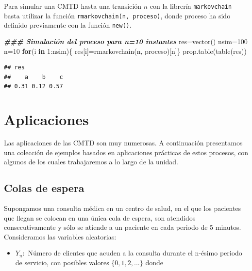 \documentclass[
]{book}
\newenvironment{Shaded}{\begin{snugshade}}{\end{snugshade}}
\newcommand{\ControlFlowTok}[1]{\textcolor[rgb]{0.13,0.29,0.53}{\textbf{#1}}}
\newcommand{\DecValTok}[1]{\textcolor[rgb]{0.00,0.00,0.81}{#1}}
\newcommand{\DocumentationTok}[1]{\textcolor[rgb]{0.56,0.35,0.01}{\textbf{\textit{#1}}}}
\newcommand{\FunctionTok}[1]{\textcolor[rgb]{0.00,0.00,0.00}{#1}}
\newcommand{\NormalTok}[1]{#1}
\newcommand{\OtherTok}[1]{\textcolor[rgb]{0.56,0.35,0.01}{#1}}
\newcommand{\SpecialCharTok}[1]{\textcolor[rgb]{0.00,0.00,0.00}{#1}}
\providecommand{\tightlist}{%
  \setlength{\itemsep}{0pt}\setlength{\parskip}{0pt}}
\newenvironment{whitebox}{
  \definecolor{shadecolor}{rgb}{255, 255, 255}  
  \color{black}
  \begin{shaded}}
 {\end{shaded}}
\theoremstyle{definition}
\theoremstyle{definition}
\theoremstyle{definition}
\theoremstyle{definition}
\theoremstyle{remark}
\begin{document}
\begin{whitebox}
Para simular una CMTD hasta una transición \(n\) con la librería \texttt{markovchain}
basta utilizar la función \texttt{rmarkovchain(n,\ proceso)}, donde proceso ha sido definido previamente con la función \texttt{new()}.

\end{whitebox}

\begin{Shaded}
\begin{Highlighting}[]
\DocumentationTok{\#\#\# Simulación del proceso para n=10 instantes }
\NormalTok{res}\OtherTok{=}\FunctionTok{vector}\NormalTok{()}
\NormalTok{nsim}\OtherTok{=}\DecValTok{100}
\NormalTok{n}\OtherTok{=}\DecValTok{10}
\ControlFlowTok{for}\NormalTok{(i }\ControlFlowTok{in} \DecValTok{1}\SpecialCharTok{:}\NormalTok{nsim)\{}
\NormalTok{  res[i]}\OtherTok{=}\FunctionTok{rmarkovchain}\NormalTok{(n, proceso)[n]\}}
\FunctionTok{prop.table}\NormalTok{(}\FunctionTok{table}\NormalTok{(res))}
\end{Highlighting}
\end{Shaded}

\begin{verbatim}
## res
##    a    b    c 
## 0.31 0.12 0.57
\end{verbatim}

\hypertarget{ExCMTD}{%
\section{Aplicaciones}\label{ExCMTD}}

Las aplicaciones de las CMTD son muy numerosas. A continuación presentamos una colección de ejemplos basados en aplicaciones prácticas de estos procesos, con algunos de los cuales trabajaremos a lo largo de la unidad.

\hypertarget{CM01}{%
\subsection{Colas de espera}\label{CM01}}

Supongamos una consulta médica en un centro de salud, en el que los pacientes que llegan se colocan en una única cola de espera, son atendidos consecutivamente y sólo se atiende a un paciente en cada periodo de 5 minutos. Consideramos las variables aleatorias:

\begin{itemize}
\tightlist
\item
  \(Y_n:\) Número de clientes que acuden a la consulta durante el n-ésimo periodo de servicio, con posibles valores \(\{0, 1, 2,...\}\) donde
\end{itemize}
\end{document}
